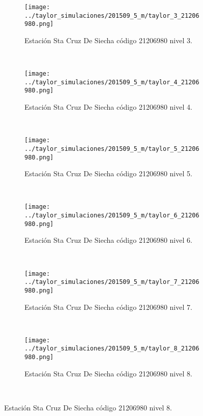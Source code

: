 \begin{figure}[H]
\centering
\begin{subfigure}[normla]{0.4\textwidth}
\caption{Estación Sta Cruz De Siecha  código 21206980 nivel 3.}
\texttt{[image: ../taylor\_simulaciones/201509\_5\_m/taylor\_3\_21206980.png]}
\end{subfigure}
~
\begin{subfigure}[normla]{0.4\textwidth}
\caption{Estación Sta Cruz De Siecha  código 21206980 nivel 4.}
\texttt{[image: ../taylor\_simulaciones/201509\_5\_m/taylor\_4\_21206980.png]}
\end{subfigure}
~
\begin{subfigure}[normla]{0.4\textwidth}
\caption{Estación Sta Cruz De Siecha  código 21206980 nivel 5.}
\texttt{[image: ../taylor\_simulaciones/201509\_5\_m/taylor\_5\_21206980.png]}
\end{subfigure}
~
\begin{subfigure}[normla]{0.4\textwidth}
\caption{Estación Sta Cruz De Siecha  código 21206980 nivel 6.}
\texttt{[image: ../taylor\_simulaciones/201509\_5\_m/taylor\_6\_21206980.png]}
\end{subfigure}
~
\begin{subfigure}[normla]{0.4\textwidth}
\caption{Estación Sta Cruz De Siecha  código 21206980 nivel 7.}
\texttt{[image: ../taylor\_simulaciones/201509\_5\_m/taylor\_7\_21206980.png]}
\end{subfigure}
~
\begin{subfigure}[normla]{0.4\textwidth}
\caption{Estación Sta Cruz De Siecha  código 21206980 nivel 8.}
\texttt{[image: ../taylor\_simulaciones/201509\_5\_m/taylor\_8\_21206980.png]}
\end{subfigure}
~
\end{figure}
           
